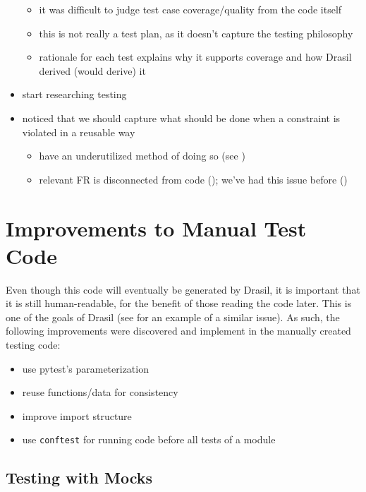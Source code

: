 \begin{itemize}
          \begin{itemize}
              \item it was difficult to judge test case coverage/quality from
                    the code itself
              \item this is not really a test plan, as it doesn't capture the
                    testing philosophy
              \item rationale for each test explains why it supports coverage
                    and how Drasil derived (would derive) it
          \end{itemize}
    \item start researching testing
    \item noticed that we should capture what should be done when a constraint
          is violated in a reusable way
          \begin{itemize}
              \item have an underutilized method of doing so (see )
              \item relevant FR is disconnected from code (); we've had
                    this issue before ()
          \end{itemize}
\end{itemize}

\section{Improvements to Manual Test Code}

Even though this code will eventually be generated by Drasil, it is important
that it is still human-readable, for the benefit of those reading the code
later. This is one of the goals of Drasil (see  for an example
of a similar issue). As such, the following improvements were discovered and
implement in the manually created testing code:

\begin{itemize}
    \item use pytest's parameterization
    \item reuse functions/data for consistency
    \item improve import structure
    \item use \texttt{conftest} for running code before all tests of a module
\end{itemize}

\subsection{Testing with Mocks}

